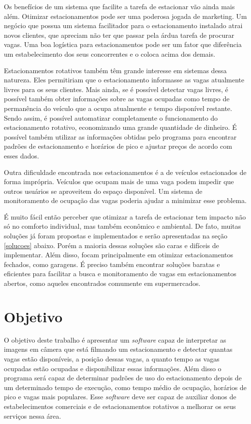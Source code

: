     Os benefícios de um sistema que facilite a tarefa de estacionar vão ainda mais além. Otimizar estacionamentos pode ser uma poderosa jogada de marketing. Um negócio que possua um sistema facilitador para o estacionamento instalado atrai novos clientes, que apreciam não ter que passar pela árdua tarefa de procurar vagas. Uma boa logística para estacionamentos pode ser um fator que diferência um estabelecimento dos seus concorrentes e o coloca acima dos demais.

    Estacionamentos rotativos também têm grande interesse em sistemas dessa natureza. Eles permitiriam que o estacionamento informasse as vagas atualmente livres para os seus clientes. Mais ainda,  se é possível detectar vagas livres, é possível também obter informações sobre as vagas ocupadas como tempo de permanência do veículo que a ocupa atualmente e tempo disponível restante. Sendo assim, é possível automatizar completamente o funcionamento do estacionamento rotativo, economizando uma grande quantidade de dinheiro. É possível também utilizar as informações obtidas pelo programa para encontrar padrões de estacionamento e horários de pico e ajustar preços de acordo com esses dados\cite{idris09}.

    Outra dificuldade encontrada nos estacionamentos é a de veículos estacionados de forma imprópria\cite{kianpisheh2012smart}. Veículos que ocupam mais de uma vaga podem impedir que outros usuários se aproveitem do espaço disponível. Um sistema de monitoramento de ocupação das vagas poderia ajudar a minimizar esse problema.

    É muito fácil então perceber que otimizar a tarefa de estacionar tem impacto não só no comforto individual, mas também econômico e ambiental. De fato, muitas soluções já foram propostas e implementados e serão apresentadas na seção \ref{solucoes} abaixo. Porém a maioria dessas soluções são caras e difíceis de implementar. Além disso, focam principalmente em otimizar estacionamentos fechados, como garagens. É preciso também encontrar soluções baratas e eficientes para facilitar a busca e monitoramento de vagas em estacionamentos abertos, como aqueles encontrados comumente em supermercados.

\section{Objetivo} \label{objetivo}
    O objetivo deste trabalho é apresentar um \textit{software} capaz de interpretar as imagens em câmera que está filmando um estacionamento e detectar quantas vagas estão disponíveis, a posição dessas vagas, a quanto tempo as vagas ocupadas estão ocupadas e disponibilizar essas informações. Além disso o programa será capaz de determinar padrões de uso do estacionamento depois de um determinado tempo de execução, como tempo médio de ocupação, horários de pico e vagas mais populares. Esse \textit{software} deve ser capaz de auxiliar donos de estabelecimentos comerciais e de estacionamentos rotativos a melhorar os seus serviços nessa área.



